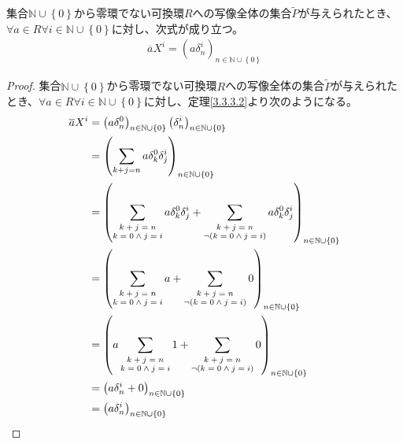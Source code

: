 \documentclass[dvipdfmx]{jsarticle}
\begin{document}
\begin{thm}\label{3.3.3.3}
集合$\mathbb{N} \cup \left\{ 0 \right\}$から零環でない可換環$R$への写像全体の集合$\widetilde{P}$が与えられたとき、$\forall a \in R\forall i \in \mathbb{N} \cup \left\{ 0 \right\}$に対し、次式が成り立つ。
\begin{align*}
\overline{a}X^{i} = \left( a\delta_{n}^{i} \right)_{n \in \mathbb{N} \cup \left\{ 0 \right\}}
\end{align*}
\end{thm}
\begin{proof}
集合$\mathbb{N} \cup \left\{ 0 \right\}$から零環でない可換環$R$への写像全体の集合$\widetilde{P}$が与えられたとき、$\forall a \in R\forall i \in \mathbb{N} \cup \left\{ 0 \right\}$に対し、定理\ref{3.3.3.2}より次のようになる。
\begin{align*}
\overline{a}X^{i} &= \left( a\delta_{n}^{0} \right)_{n \in \mathbb{N} \cup \left\{ 0 \right\}}\left( \delta_{n}^{i} \right)_{n \in \mathbb{N} \cup \left\{ 0 \right\}}\\
&= \left( \sum_{k + j = n}  a\delta_{k}^{0}\delta_{j}^{i} \right)_{n \in \mathbb{N} \cup \left\{ 0 \right\}}\\
&= \left( \sum_{\scriptsize \begin{matrix} k + j = n \\k = 0 \land j = i \end{matrix}}  a\delta_{k}^{0}\delta_{j}^{i} + \sum_{\scriptsize \begin{matrix} k + j = n \\ \neg(k = 0 \land j = i) \end{matrix}}  a\delta_{k}^{0}\delta_{j}^{i} \right)_{n \in \mathbb{N} \cup \left\{ 0 \right\}}\\
&= \left( \sum_{\scriptsize \begin{matrix} k + j = n \\k = 0 \land j = i \end{matrix}} a + \sum_{\scriptsize \begin{matrix} k + j = n \\ \neg(k = 0 \land j = i) \end{matrix}} 0 \right)_{n \in \mathbb{N} \cup \left\{ 0 \right\}}\\
&= \left( a\sum_{\scriptsize \begin{matrix} k + j = n \\k = 0 \land j = i \end{matrix}}  1 + \sum_{\scriptsize \begin{matrix} k + j = n \\ \neg(k = 0 \land j = i) \end{matrix}} 0 \right)_{n \in \mathbb{N} \cup \left\{ 0 \right\}}\\
&= \left( a\delta_{n}^{i} + 0 \right)_{n \in \mathbb{N} \cup \left\{ 0 \right\}}\\
&= \left( a\delta_{n}^{i} \right)_{n \in \mathbb{N} \cup \left\{ 0 \right\}}
\end{align*}
\end{proof}
\end{document}
